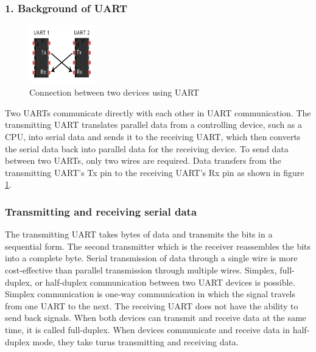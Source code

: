 \subsubsection{1. Background of UART}
\begin{figure}
    \includegraphics[width=0.25\textwidth]{figure/3_1.png}
    \caption{Connection between two devices using UART}
    \label{fig:connection-two-devices}
\end{figure}
Two UARTs communicate directly with each other in UART communication. The transmitting UART translates parallel data from a controlling device, such as a CPU, into serial data and sends it to the receiving UART, which then converts the serial data back into parallel data for the receiving device. To send data between two UARTs, only two wires are required. Data transfers from the transmitting UART's Tx pin to the receiving UART's Rx pin as shown in figure \ref{fig:connection-two-devices}.
\subsubsection{Transmitting and receiving serial data}
The transmitting UART takes bytes of data and transmits the bits in a sequential form. The second transmitter which is the receiver reassembles the bits into a complete byte. Serial transmission of data through a single wire is more cost-effective than parallel transmission through multiple wires. \newline
Simplex, full-duplex, or half-duplex communication between two UART devices is possible. Simplex communication is one-way communication in which the signal travels from one UART to the next. The receiving UART does not have the ability to send back signals. When both devices can transmit and receive data at the same time, it is called full-duplex. When devices communicate and receive data in half-duplex mode, they take turns transmitting and receiving data. \newline
